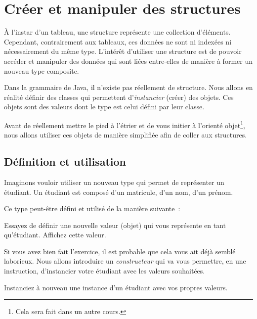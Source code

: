 \documentclass[a4paper,11pt]{style-esi/td}
\begin{document}
	 
\section{Créer et manipuler des structures}

	À l'instar d'un tableau, une structure représente une collection d'éléments. Cependant, contrairement aux tableaux, ces données ne sont ni indexées ni nécessairement du même type. L'intérêt d'utiliser une structure est de pouvoir accéder et manipuler des données qui sont liées entre-elles de manière à former un nouveau type composite.

	Dans la grammaire de Java, il n'existe pas réellement de structure. Nous allons en réalité définir des classes qui permettent d'\emph{instancier} (créer) des objets. Ces objets sont des valeurs dont le type est celui défini par leur classe.

	Avant de réellement mettre le pied à l'étrier et de vous initier à l'orienté objet\footnote{Cela sera fait dans un autre cours.}, nous allons utiliser ces objets de manière simplifiée afin de coller aux structures.


	\subsection{Définition et utilisation}

	Imaginons vouloir utiliser un nouveau type qui permet de représenter un étudiant. Un étudiant est composé d'un matricule, d'un nom, d'un prénom.

	Ce type peut-être défini et utilisé de la manière suivante~:


	Essayez de définir une nouvelle valeur (objet) qui vous représente en tant qu'étudiant. Affichez cette valeur.

	Si vous avez bien fait l'exercice, il est probable que cela vous ait déjà semblé laborieux. Nous allons introduire un \emph{constructeur} qui va vous permettre, en une instruction, d'instancier votre étudiant avec les valeurs souhaitées.


	Instanciez à nouveau une instance d'un étudiant avec vos propres valeurs.
\end{document}
